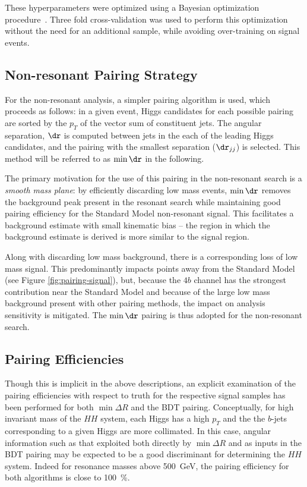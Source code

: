 These hyperparameters were optimized using a Bayesian optimization
procedure~\cite{skopt}. Three fold cross-validation was used to perform this
optimization without the need for an additional sample, while avoiding
over-training on signal events.

\subsection{Non-resonant Pairing Strategy}
For the non-resonant analysis, a simpler pairing algorithm is used, which 
proceeds as follows: in a given event, Higgs candidates for each possible pairing
are sorted by the $p_{T}$ of the vector sum of constituent jets. The angular separation,
$\dr$ is computed between jets in the each of the leading Higgs candidates, and the 
pairing with the smallest separation ($\dr_{jj}$) is selected. This method will be 
referred to as $\min{\dr}$ in the following.

The primary motivation for the use of this pairing in the non-resonant search is a 
\emph{smooth mass plane}: by efficiently discarding low mass events, $\min{\dr}$ removes 
the background peak present in the resonant search while maintaining good pairing 
efficiency for the Standard Model non-resonant signal. This facilitates a background estimate with 
small kinematic bias -- the region in which the background estimate is derived is 
more similar to the signal region. 

Along with discarding low mass background, there is a corresponding loss of low mass signal.
This predominantly impacts points away from the Standard Model (see Figure \ref{fig:pairing-signal}), 
but, because the $4b$ channel has the strongest contribution near the Standard Model and because of the 
large low mass background present with other pairing methods, the impact on analysis sensitivity 
is mitigated. The $\min{\dr}$ pairing is thus adopted for the non-resonant search.

\subsection{Pairing Efficiencies}
Though this is implicit in the above descriptions, an explicit examination of the pairing 
efficiencies with respect to truth for the respective signal samples has been performed for both 
$\min{\Delta R}$ and the BDT pairing. Conceptually, for high invariant mass of the $HH$ system, 
each Higgs has a high $p_{T}$ and the the $b$-jets corresponding to a given Higgs are more collimated. 
In this case, angular information such as that exploited both directly by $\min{\Delta R}$ and as inputs in 
the BDT pairing may be expected to be a good discriminant for determining the $HH$ system. Indeed 
for resonance masses above \SI{500}{\GeV}, the pairing efficiency for both algorithms is close to 
100~\%.


